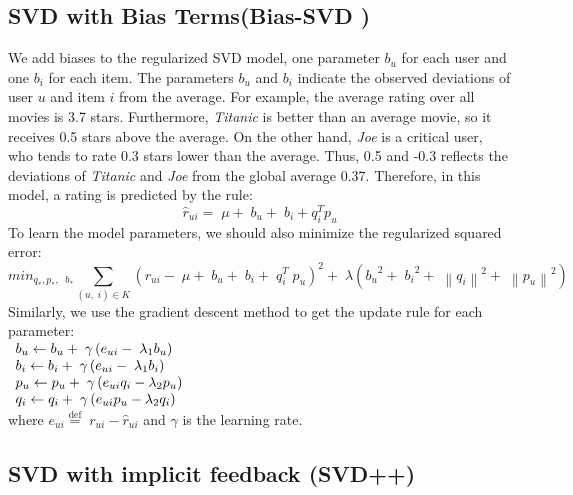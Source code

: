 \documentclass[oneside,13pt]{extreport}
\begin{document}
\subsection{SVD with Bias Terms(Bias-SVD )}
We add biases to the regularized SVD model, one parameter $b_u$ for each user and one $b_i$ for each item. The parameters $b_u$ and $b_i$ indicate the observed deviations of user $u$ and item $i$ from the average. For example, the average rating over all movies is 3.7 stars. Furthermore, \emph{Titanic} is better than an average movie, so it receives 0.5 stars above the average. On the other hand, \emph{Joe} is a critical user, who tends to rate 0.3 stars lower than the average. Thus, 0.5 and -0.3 reflects the deviations of \emph{Titanic} and \emph{Joe} from the global average 0.37. Therefore, in this model,
a rating is predicted by the rule:
\begin{equation}
{\hat r_{ui}} = \;\mu  + \;{b_u} + \;{b_i} + q_i^T{p_u}
\label{eq: SVD}
\end{equation}
To learn the model parameters, we should also minimize the regularized squared error:
\begin{equation}
mi{n_{{q_*},{p_*},\;\;{b_*}}}\mathop \sum \limits_{\left( {u,\;i} \right) \in K} {\left( {{r_{ui}} - \;\mu  + \;{b_u} + \;{b_i} + \;q_i^T\;{p_u}} \right)^2} + \;\lambda \left( {{b_u}^2 + \;{b_i}^2 + \;{{\left\| {{q_i}} \right\|}^2} + \;{{\left\| {{p_u}} \right\|}^2}} \right)
\end{equation}
Similarly, we use the gradient descent method to get the update rule for each parameter:
\\
$
\begin{array}{l}{b_u} \leftarrow {b_u} + {\rm{\;}}\gamma \left( {{e_{ui}} - {\rm{\;}}{\lambda _1}{b_u}} \right)\\{b_i} \leftarrow {b_i} + {\rm{\;}}\gamma \left( {{e_{ui}} - {\rm{\;}}{\lambda _1}{b_i}} \right)\\{p_u} \leftarrow {p_u} + {\rm{\;}}\gamma \left( {{e_{ui}}{q_i} - {\lambda _2}{p_u}} \right)\\{q_i} \leftarrow {q_i} + {\rm{\;}}\gamma \left( {{e_{ui}}{p_u} - {\lambda _2}{q_i}} \right)\end{array}
$
\\
where ${e_{ui}} \stackrel{\text{def}}{=} \;{r_{ui}} - \hat r_{ui}$ and $\gamma$ is the learning rate.

\subsection{SVD with implicit feedback (SVD++)}
\end{document}
